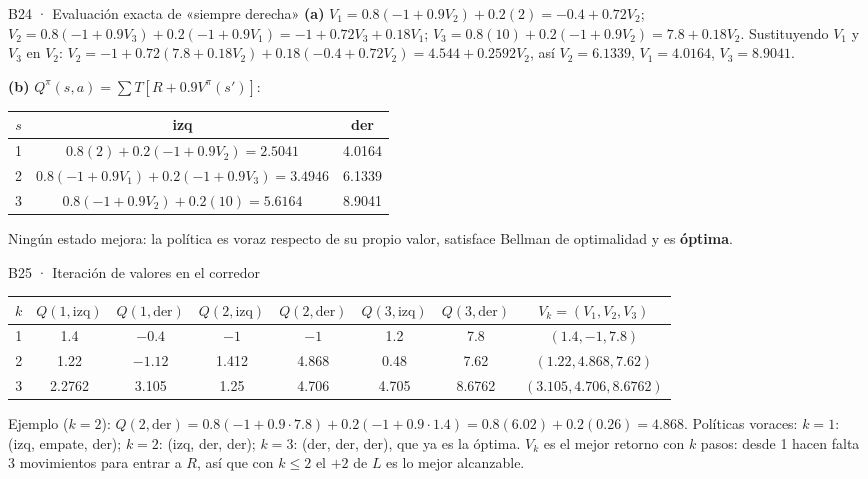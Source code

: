 \begin{solucion}{B24 · Evaluación exacta de «siempre derecha»}
\textbf{(a)} $V_1=0.8(-1+0.9V_2)+0.2(2)=-0.4+0.72V_2$;\quad
$V_2=0.8(-1+0.9V_3)+0.2(-1+0.9V_1)=-1+0.72V_3+0.18V_1$;\quad
$V_3=0.8(10)+0.2(-1+0.9V_2)=7.8+0.18V_2$.
Sustituyendo $V_1$ y $V_3$ en $V_2$: $V_2=-1+0.72(7.8+0.18V_2)+0.18(-0.4+0.72V_2)=4.544+0.2592V_2$, así
$V_2=\mathbf{6.1339}$, $V_1=\mathbf{4.0164}$, $V_3=\mathbf{8.9041}$.

\textbf{(b)} $Q^\pi(s,a)=\sum T[R+0.9V^\pi(s')]$:
\begin{center}\small
\begin{tabular}{c|cc}
$s$ & izq & der\\\hline
1 & $0.8(2)+0.2(-1+0.9V_2)=2.5041$ & 4.0164\\
2 & $0.8(-1+0.9V_1)+0.2(-1+0.9V_3)=3.4946$ & 6.1339\\
3 & $0.8(-1+0.9V_2)+0.2(10)=5.6164$ & 8.9041
\end{tabular}
\end{center}
Ningún estado mejora: la política es voraz respecto de su propio valor, satisface Bellman de optimalidad y es \textbf{óptima}.
\end{solucion}

\begin{solucion}{B25 · Iteración de valores en el corredor}
\begin{center}\small
\begin{tabular}{c|cc|cc|cc|c}
\toprule
$k$ & $Q(1,\text{izq})$ & $Q(1,\text{der})$ & $Q(2,\text{izq})$ & $Q(2,\text{der})$ & $Q(3,\text{izq})$ & $Q(3,\text{der})$ & $V_k=(V_1,V_2,V_3)$\\\midrule
1 & 1.4 & $-0.4$ & $-1$ & $-1$ & 1.2 & 7.8 & $(1.4,-1,7.8)$\\
2 & 1.22 & $-1.12$ & 1.412 & 4.868 & 0.48 & 7.62 & $(1.22,4.868,7.62)$\\
3 & 2.2762 & 3.105 & 1.25 & 4.706 & 4.705 & 8.6762 & $(3.105,4.706,8.6762)$\\\bottomrule
\end{tabular}
\end{center}
Ejemplo ($k=2$): $Q(2,\text{der})=0.8(-1+0.9\cdot7.8)+0.2(-1+0.9\cdot1.4)=0.8(6.02)+0.2(0.26)=4.868$.
Políticas voraces: $k=1$: (izq, empate, der); $k=2$: (izq, der, der); $k=3$: (der, der, der), que ya es la óptima.
$V_k$ es el mejor retorno con $k$ pasos: desde 1 hacen falta 3 movimientos para entrar a $R$, así que con $k\le2$ el $+2$ de $L$ es lo mejor alcanzable.
\end{solucion}

